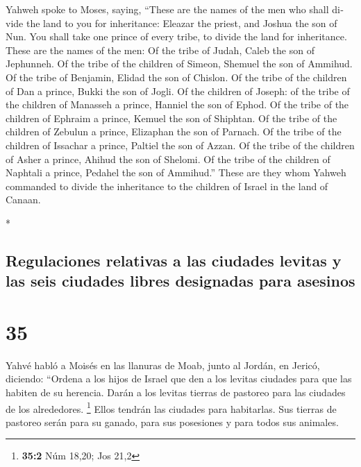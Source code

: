 \begin{paracol}{2}
\begin{otherlanguage}{english}
 Yahweh spoke to Moses, saying,  ``These
are the names of the men who shall divide the land to you for
inheritance: Eleazar the priest, and Joshua the son of Nun.
 You shall take one prince of every tribe, to divide the
land for inheritance.  These are the names of the men: Of
the tribe of Judah, Caleb the son of Jephunneh.  Of the
tribe of the children of Simeon, Shemuel the son of Ammihud.
 Of the tribe of Benjamin, Elidad the son of Chislon.
 Of the tribe of the children of Dan a prince, Bukki the
son of Jogli.  Of the children of Joseph: of the tribe of
the children of Manasseh a prince, Hanniel the son of Ephod.
 Of the tribe of the children of Ephraim a prince, Kemuel
the son of Shiphtan.  Of the tribe of the children of
Zebulun a prince, Elizaphan the son of Parnach.  Of the
tribe of the children of Issachar a prince, Paltiel the son of Azzan.
 Of the tribe of the children of Asher a prince, Ahihud
the son of Shelomi.  Of the tribe of the children of
Naphtali a prince, Pedahel the son of Ammihud.''  These
are they whom Yahweh commanded to divide the inheritance to the children
of Israel in the land of Canaan.

\end{otherlanguage}

\switchcolumn[0]*

\hypertarget{regulaciones-relativas-a-las-ciudades-levitas-y-las-seis-ciudades-libres-designadas-para-asesinos}{%
\subsection{Regulaciones relativas a las ciudades levitas y las seis
ciudades libres designadas para
asesinos}\label{regulaciones-relativas-a-las-ciudades-levitas-y-las-seis-ciudades-libres-designadas-para-asesinos}}

\hypertarget{section-68}{%
\section{35}\label{section-68}}

 Yahvé habló a Moisés en las llanuras de Moab, junto al
Jordán, en Jericó, diciendo:  ``Ordena a los hijos de
Israel que den a los levitas ciudades para que las habiten de su
herencia. Darán a los levitas tierras de pastoreo para las ciudades de
los alrededores. \footnote{\textbf{35:2} Núm 18,20; Jos 21,2}
 Ellos tendrán las ciudades para habitarlas. Sus tierras
de pastoreo serán para su ganado, para sus posesiones y para todos sus
animales.


\end{paracol}
